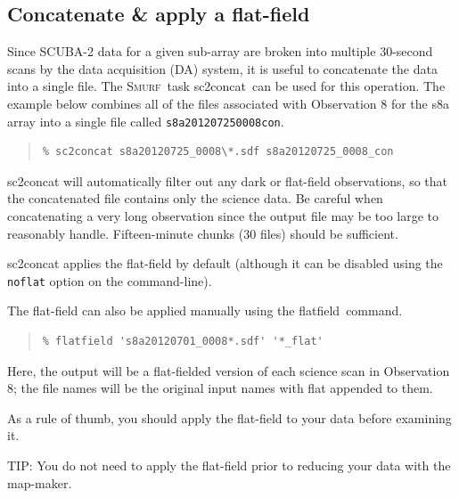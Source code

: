 \documentclass[twoside,11pt]{article}
\newenvironment{latexonly}{}{}
\newcommand{\xref}[3]{#1}
\newcommand{\xlabel}[1]{}
\renewcommand{\_}{\texttt{\symbol{95}}}
\newenvironment{fmpage}[1]{\begin{lrbox}{\fmbox}\begin{minipage}{#1}}{\end{minipage}\end{lrbox}\fbox{\usebox{\fmbox}}}
\newenvironment{myquote}{
   \color{MidnightBlue}\begin{quote}\begin{small}}{
   \end{small}\end{quote}
}
\newcommand{\smurf}{\xref{\textsc{Smurf}}{sun258}{}}
\newcommand{\task}[1]{\textsf{#1}}
\newcommand{\param}[1]{\texttt{#1}}
\newcommand{\file}[1]{\texttt{#1}}
\newcommand{\concat}{\xref{\task{sc2concat}}{sun258}{SC2CONCAT}}
\newcommand{\flatfield}{\xref{\task{flatfield}}{sun258}{FLATFIELD}}
\renewenvironment{myquote}{
      \begin{quote}\begin{small}}{
      \end{small}\end{quote}
   }
\begin{document}
\subsection{\xlabel{concat}Concatenate \& apply a flat-field}
\label{sec:concat}

Since SCUBA-2 data for a given sub-array are broken into multiple
30-second scans by the data acquisition (DA) system, it is useful to
concatenate the data into a single file. The \smurf\ task \concat\ can
be used for this operation. The example below combines all of the
files associated with Observation 8 for the s8a array into a single
file called \file{s8a20120725\_0008\_con}.

\begin{myquote}
\begin{verbatim}
% sc2concat s8a20120725_0008\*.sdf s8a20120725_0008_con
\end{verbatim}
\end{myquote}
\task{sc2concat} will automatically filter out any dark or flat-field
observations, so that the concatenated file contains only the science
data. Be careful when concatenating a very long observation since the
output file may be too large to reasonably handle. Fifteen-minute
chunks (30 files) should be sufficient.

\task{sc2concat} applies the flat-field by default (although it can be
disabled using the \param{noflat} option on the command-line).

The flat-field can also be applied manually using the \flatfield\ command.

\begin{myquote}
\begin{verbatim}
% flatfield 's8a20120701_0008*.sdf' '*_flat'
\end{verbatim}
\end{myquote}
Here, the output will be a flat-fielded version of each science scan
in Observation 8; the file names will be the original input
names with \_flat appended to them.

As a rule of thumb, you should apply the flat-field to your data
before examining it.


\begin{latexonly}
\begin{center}
\begin{fmpage}{0.95\linewidth}
\vspace{0.1cm}
TIP: You do not need to apply the flat-field prior to reducing your
data with the map-maker.
\end{fmpage}
\end{center}
\end{latexonly}
\end{document}
